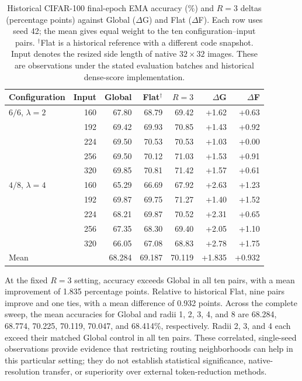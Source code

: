 \begin{table}[htbp]
\centering
\small
\setlength{\tabcolsep}{4pt}
\begin{tabular}{lrrrrrr}
\hline
Configuration & Input & Global & Flat$^\dagger$ & $R=3$ & $\Delta$G & $\Delta$F \\
\hline
$6/6$, $\lambda=2$ & 160 & 67.80 & 68.79 & 69.42 & +1.62 & +0.63 \\
 & 192 & 69.42 & 69.93 & 70.85 & +1.43 & +0.92 \\
 & 224 & 69.50 & 70.53 & 70.53 & +1.03 & +0.00 \\
 & 256 & 69.50 & 70.12 & 71.03 & +1.53 & +0.91 \\
 & 320 & 69.85 & 70.81 & 71.42 & +1.57 & +0.61 \\
$4/8$, $\lambda=4$ & 160 & 65.29 & 66.69 & 67.92 & +2.63 & +1.23 \\
 & 192 & 69.87 & 69.75 & 71.27 & +1.40 & +1.52 \\
 & 224 & 68.21 & 69.87 & 70.52 & +2.31 & +0.65 \\
 & 256 & 67.35 & 68.30 & 69.40 & +2.05 & +1.10 \\
 & 320 & 66.05 & 67.08 & 68.83 & +2.78 & +1.75 \\
\hline
Mean & & 68.284 & 69.187 & 70.119 & +1.835 & +0.932 \\
\hline
\end{tabular}
\caption{Historical CIFAR-100 final-epoch EMA accuracy (\%) and $R=3$ deltas (percentage points) against Global ($\Delta$G) and Flat ($\Delta$F). Each row uses seed 42; the mean gives equal weight to the ten configuration--input pairs. $^\dagger$Flat is a historical reference with a different code snapshot. Input denotes the resized side length of native $32\times32$ images. These are observations under the stated evaluation batches and historical dense-score implementation.}
\label{tab:cifar-spatial-audit}
\end{table}

At the fixed $R=3$ setting, accuracy exceeds Global in all ten pairs, with a mean improvement of 1.835 percentage points.
Relative to historical Flat, nine pairs improve and one ties, with a mean difference of 0.932 points.
Across the complete sweep, the mean accuracies for Global and radii 1, 2, 3, 4, and 8 are 68.284, 68.774, 70.225, 70.119, 70.047, and 68.414\%, respectively.
Radii 2, 3, and 4 each exceed their matched Global control in all ten pairs.
These correlated, single-seed observations provide evidence that restricting routing neighborhoods can help in this particular setting; they do not establish statistical significance, native-resolution transfer, or superiority over external token-reduction methods.

